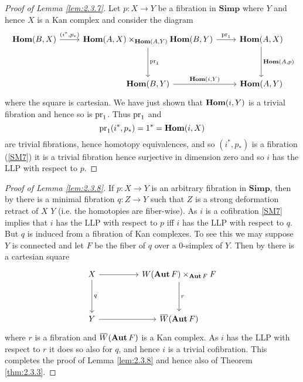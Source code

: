 \documentclass[../main]{subfiles}
\begin{document}
\begin{proof}[Proof of Lemma \ref{lem:2.3.7}]
Let $p \colon X \longrightarrow Y$ be a fibration in $\mathbf{Simp}$ where $Y$ and hence $X$ is a Kan complex and consider the diagram
\[\begin{tikzcd}
	{\UHom (B, X)} & {\UHom (A, X)\times_{\UHom (A, Y)} \UHom(B,Y)} & {\UHom (A, X)} \\ \\
	& {\UHom (B, Y)} & {\UHom (A, Y)}
	\arrow["{\UHom (i, Y)}", from=3-2, to=3-3]
	\arrow["{\UHom (A, p)}", from=1-3, to=3-3]
	\arrow["{\pr_1}", from=1-2, to=1-3]
	\arrow["{\pr_1}", from=1-2, to=3-2]
	\arrow["{(i^{\ast}, p_{\ast})}", from=1-1, to=1-2]
\end{tikzcd}\]
where the square is cartesian. We have just shown that $\operatorname{\mathbf{Hom}} (i, Y)$ is a trivial fibration and hence so is $\operatorname{pr}_1$. Thus $\operatorname{pr}_1$ and \[\operatorname{pr}_1 (i^{\ast}, p_{\ast }) = 1^{\ast } = \operatorname{\mathbf{Hom}} (i, X)\] are trivial fibrations, hence homotopy equivalences, and so $(i^{\ast }, p_{\ast })$ is a fibration (\ref{SM7}) it is a trivial fibration hence surjective in dimension zero and so $i$ has the LLP with respect to $p$.
\end{proof}

\begin{proof}[Proof of Lemma \ref{lem:2.3.8}]
If $p \colon X \longrightarrow Y$ is an arbitrary fibration in $\mathbf{Simp}$, then by \cite{barratt_semisimplicial_1959}
there is a minimal fibration $q \colon Z \longrightarrow Y$ such that $Z$ is a strong deformation retract of $X$  $Y$ (i.e. the homotopies are fiber-wise). As $i$ is a cofibration \ref{SM7} implies that $i$ has the LLP with respect to $p$ iff $i$ has the LLP with respect to $q$. But $q$ is induced from a fibration of Kan complexes. To see this we may suppose $Y$ is connected and let $F$ be the fiber of $q$ over a 0-simplex of $Y$. Then by \cite{barratt_semisimplicial_1959} there is a cartesian square
\[\begin{tikzcd}
    X && {W(\operatorname{\mathbf{Aut}} F) \times_{\operatorname{\mathbf{Aut}}F} F} \\\\
	Y && {\xoverline{W} (\operatorname{\mathbf{Aut}} F)}
	\arrow["r", from=1-3, to=3-3]
	\arrow["q", from=1-1, to=3-1]
	\arrow[from=3-1, to=3-3]
	\arrow[from=1-1, to=1-3]
\end{tikzcd}\]
where $r$ is a fibration and $\xoverline{W}(\operatorname{\mathbf{Aut}} F)$ is a Kan complex. As $i$ has the LLP with respect to $r$ it does so also for $q$, and hence $i$ is a trivial cofibration. This completes the proof of Lemma \ref{lem:2.3.8} and hence also of Theorem \ref{thm:2.3.3}.
\end{proof}
\end{document}
